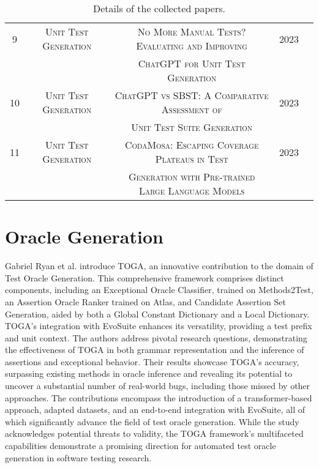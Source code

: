 \begin{table}[H]
\begin{tabular}{c|c|c|c|c}
        9 & \scriptsize\textsc{Unit Test Generation} & \scriptsize\textsc{No More Manual Tests? Evaluating and Improving} & 2023 & \cite{yuan_no_2023}\\
        & & \scriptsize\textsc{ChatGPT for Unit Test Generation} & & \\
        
        10 & \scriptsize\textsc{Unit Test Generation} & \scriptsize\textsc{ChatGPT vs SBST: A Comparative Assessment of} & 2023 & \cite{tang_chatgpt_2023}\\
        & & \scriptsize\textsc{Unit Test Suite Generation} & & \\
        
        11 & \scriptsize\textsc{Unit Test Generation} & \scriptsize\textsc{CodaMosa: Escaping Coverage Plateaus in Test} & 2023 & \cite{lemieux_codamosa_2023}\\
        & & \scriptsize\textsc{Generation with Pre-trained Large Language Models} & & \\
        
    \end{tabular}

\caption{Details of the collected papers.}
\label{tab:collected_papers}
\end{table}

\section{Oracle Generation}
\label{sec:soa_oracle_generation}
\vspace{0.2 cm}

Gabriel Ryan et al. introduce TOGA\cite{gabriel_ryan_toga_2022}, an innovative contribution to the domain of Test Oracle Generation. This comprehensive framework comprises distinct components, including an Exceptional Oracle Classifier, trained on Methods2Test\cite{noauthor_unit_2023}, an Assertion Oracle Ranker trained on Atlas, and Candidate Assertion Set Generation, aided by both a Global Constant Dictionary and a Local Dictionary. TOGA's integration with EvoSuite enhances its versatility, providing a test prefix and unit context. The authors address pivotal research questions, demonstrating the effectiveness of TOGA in both grammar representation and the inference of assertions and exceptional behavior. Their results showcase TOGA's accuracy, surpassing existing methods in oracle inference and revealing its potential to uncover a substantial number of real-world bugs, including those missed by other approaches. The contributions encompass the introduction of a transformer-based approach, adapted datasets, and an end-to-end integration with EvoSuite, all of which significantly advance the field of test oracle generation. While the study acknowledges potential threats to validity, the TOGA framework's multifaceted capabilities demonstrate a promising direction for automated test oracle generation in software testing research.

